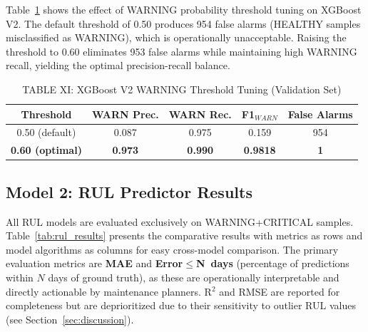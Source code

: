 \documentclass[conference]{IEEEtran}
\begin{document}
Table~\ref{tab:threshold} shows the effect of WARNING probability threshold tuning on XGBoost V2. The default threshold of 0.50 produces 954 false alarms (HEALTHY samples misclassified as WARNING), which is operationally unacceptable. Raising the threshold to 0.60 eliminates 953 false alarms while maintaining high WARNING recall, yielding the optimal precision-recall balance.

\begin{table}[htbp]
\caption{TABLE XI: XGBoost V2 WARNING Threshold Tuning (Validation Set)}
\centering
\begin{tabular}{ccccc}
\hline
\textbf{Threshold} & \textbf{WARN Prec.} & \textbf{WARN Rec.} & \textbf{F1$_{WARN}$} & \textbf{False Alarms} \\
\hline
0.50 (default) & 0.087 & 0.975 & 0.159 & 954 \\
\textbf{0.60 (optimal)} & \textbf{0.973} & \textbf{0.990} & \textbf{0.9818} & \textbf{1} \\
\hline
\end{tabular}
\label{tab:threshold}
\end{table}

\subsection{Model 2: RUL Predictor Results}

All RUL models are evaluated exclusively on WARNING+CRITICAL samples.
Table~\ref{tab:rul_results} presents the comparative results with metrics
as rows and model algorithms as columns for easy cross-model comparison.
The primary evaluation metrics are \textbf{MAE} and \textbf{Error$\leq$N~days}
(percentage of predictions within $N$ days of ground truth), as these are
operationally interpretable and directly actionable by maintenance planners.
R$^2$ and RMSE are reported for completeness but are deprioritized due to
their sensitivity to outlier RUL values (see Section~\ref{sec:discussion}).
\end{document}
